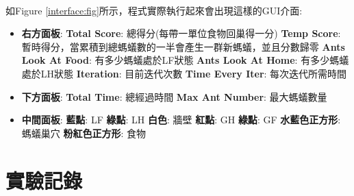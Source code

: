 \documentclass[]{article}
\begin{document}
\paragraph{}
如Figure \ref{interface:fig}所示，程式實際執行起來會出現這樣的GUI介面:
\begin{itemize}
	\item \textbf{右方面板}:
	\subitem \textbf{Total Score}: 總得分(每帶一單位食物回巢得一分)
	\subitem \textbf{Temp Score}: 暫時得分，當累積到總螞蟻數的一半會產生一群新螞蟻，並且分數歸零
	\subitem \textbf{Ants Look At Food}: 有多少螞蟻處於LF狀態
	\subitem \textbf{Ants Look At Home}: 有多少螞蟻處於LH狀態
	\subitem \textbf{Iteration}: 目前迭代次數
	\subitem \textbf{Time Every Iter}: 每次迭代所需時間
	
	\item \textbf{下方面板}:
	\subitem \textbf{Total Time}: 總經過時間
	\subitem \textbf{Max Ant Number}: 最大螞蟻數量
	
	\item \textbf{中間面板}:
	\subitem \textbf{藍點}: LF
	\subitem \textbf{綠點}: LH
	\subitem \textbf{白色}: 牆壁
	\subitem \textbf{紅點}: GH
	\subitem \textbf{綠點}: GF
	\subitem \textbf{水藍色正方形}: 螞蟻巢穴
	\subitem \textbf{粉紅色正方形}: 食物
\end{itemize}


\section{實驗記錄}
\label{experiment}
\end{document}
